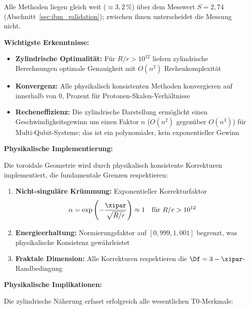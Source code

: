 Alle Methoden liegen gleich weit ($\approx 3{,}2$\,\%) über dem Messwert $S = 2{,}74$ (Abschnitt~\ref{sec:ibm_validation}); zwischen ihnen unterscheidet die Messung nicht.

\textbf{Wichtigste Erkenntnisse:}
\begin{itemize}
	\item \textbf{Zylindrische Optimalität:} Für $R/r > 10^{12}$ liefern zylindrische Berechnungen 
	optimale Genauigkeit mit $O(n^2)$ Rechenkomplexität
	\item \textbf{Konvergenz:} Alle physikalisch konsistenten Methoden konvergieren 
	auf innerhalb von 0, Prozent für Protonen-Skalen-Verhältnisse
	\item \textbf{Recheneffizienz:} Die zylindrische Darstellung ermöglicht einen 
	Geschwindigkeitsgewinn um einen Faktor $n$ ($O(n^2)$ gegenüber $O(n^3)$) für Multi-Qubit-Systeme; das ist ein polynomialer, kein exponentieller Gewinn
\end{itemize}

\textbf{Physikalische Implementierung:}

Die toroidale Geometrie wird durch physikalisch konsistente Korrekturen 
implementiert, die fundamentale Grenzen respektieren:

\begin{enumerate}
	\item \textbf{Nicht-singuläre Krümmung:} Exponentieller Korrekturfaktor 
	\[
	\alpha = \exp\left(-\frac{\xipar}{\sqrt{R/r}}\right) \approx 1 \quad \text{für } R/r > 10^{12}
	\]
	
	\item \textbf{Energieerhaltung:} Normierungsfaktor auf $[0,\!999, 1,\!001]$ begrenzt, 
	was physikalische Konsistenz gewährleistet
	
	\item \textbf{Fraktale Dimension:} Alle Korrekturen respektieren die $\Df = 3 - \xipar$-Randbedingung
\end{enumerate}

\textbf{Physikalische Implikationen:}

Die zylindrische Näherung erfasst erfolgreich alle wesentlichen T0-Merkmale:


